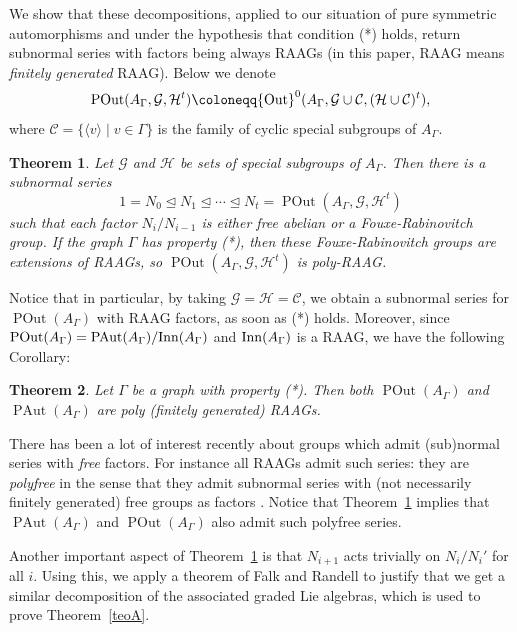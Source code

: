 \documentclass[10pt]{amsart}
\newtheorem{teo}{Theorem}
\theoremstyle{definition}
\newcommand{\Out}{{\rm Out}}
\newcommand{\Inn}{{\rm Inn}}
\newcommand{\PAut}{\operatorname{PAut}}
\newcommand{\POut}{\operatorname {POut}}
\theoremstyle{definition}
\numberwithin{equation}{section}
\begin{document}
We show that these decompositions, applied to our situation of pure symmetric automorphisms and under the hypothesis that condition (*) holds,  return subnormal series with factors being always RAAGs (in this paper, RAAG means \emph{finitely generated} RAAG). Below we denote
 \[\POut(A_\Gamma,\mathcal{G},\mathcal{H}^t)\coloneqq \Out^0(A_\Gamma,\mathcal{G}\cup\mathcal{C},(\mathcal{H}\cup\mathcal{C})^t),\]
where  $\mathcal{C} = \{ \langle v \rangle \mid v \in \Gamma\}$ is the family of cyclic special subgroups of $A_\Gamma$.

 \begin{teo} \label{teoC}
 Let $\mathcal{G}$ and $\mathcal{H}$ be sets of special subgroups of $A_\Gamma$. Then there is a subnormal series
 \[1=N_0\trianglelefteq N_1\trianglelefteq\cdots\trianglelefteq N_t=\POut(A_\Gamma,\mathcal{G},\mathcal{H}^t)\]
 such that each factor $N_i/N_{i-1}$ is either free abelian or a Fouxe-Rabinovitch group. If the graph $\Gamma$ has property (*), then these Fouxe-Rabinovitch groups are extensions of RAAGs, so $\POut(A_\Gamma,\mathcal{G},\mathcal{H}^t)$ is poly-RAAG.
 \end{teo}

 Notice that in particular, by taking $\mathcal{G} = \mathcal{H} = \mathcal{C}$, we obtain a subnormal series for $\POut(A_\Gamma)$ with RAAG factors, as soon as (*) holds. Moreover, since $\POut(A_\Gamma) = \PAut(A_\Gamma)/\Inn(A_\Gamma)$ and $\Inn(A_{\Gamma})$ is a RAAG,  we have the following Corollary:
 
 \begin{teo} Let $\Gamma$ be a graph with property (*). Then both $\POut(A_\Gamma)$ and $\PAut(A_\Gamma)$ are poly (finitely generated) RAAGs.
\end{teo}



 There has been a lot of interest recently about groups which admit (sub)normal series with \emph{free} factors. For instance all RAAGs admit such series: they are \emph{polyfree} in the sense that they admit subnormal series with (not necessarily finitely generated) free groups as factors \cite{DuchampKrob}. Notice that Theorem~\ref{teoC} implies that $\PAut(A_\Gamma)$ and $\POut(A_\Gamma)$ also admit such polyfree series.

 Another important aspect of Theorem~\ref{teoC} is that $N_{i+1}$ acts trivially on $N_i/N_i'$ for all $i$. Using this, we apply a theorem of Falk and Randell \cite{FalkRandell} to justify that we get a similar decomposition of the associated graded Lie algebras, which is used to prove Theorem~\ref{teoA}.
\end{document}
